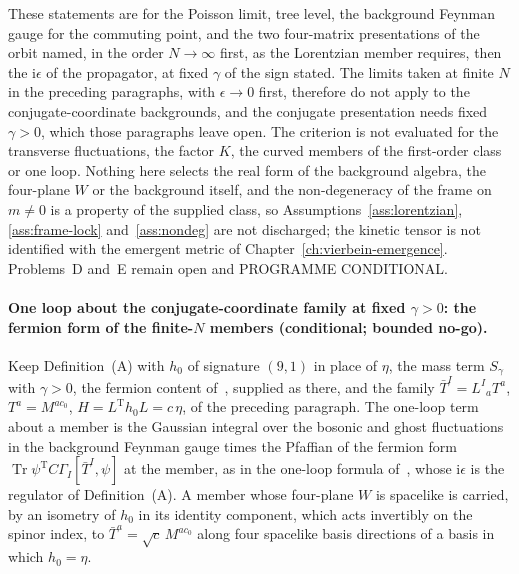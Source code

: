 These statements are for the Poisson limit, tree level, the background Feynman gauge for the commuting point, and the two four-matrix presentations of the orbit named, in the order \(N\to\infty\) first, as the Lorentzian member requires, then the \(\mathrm i\epsilon\) of the propagator, at fixed \(\gamma\) of the sign stated. The limits taken at finite \(N\) in the preceding paragraphs, with \(\epsilon\to0\) first, therefore do not apply to the conjugate-coordinate backgrounds, and the conjugate presentation needs fixed \(\gamma>0\), which those paragraphs leave open. The criterion is not evaluated for the transverse fluctuations, the factor \(K\), the curved members of the first-order class or one loop. Nothing here selects the real form of the background algebra, the four-plane \(W\) or the background itself, and the non-degeneracy of the frame on \(m\neq0\) is a property of the supplied class, so Assumptions~\ref{ass:lorentzian}, \ref{ass:frame-lock} and~\ref{ass:nondeg} are not discharged; the kinetic tensor is not identified with the emergent metric of Chapter~\ref{ch:vierbein-emergence}. Problems~D and~E remain open and PROGRAMME CONDITIONAL.

\paragraph{One loop about the conjugate-coordinate family at fixed \(\gamma>0\): the fermion form of the finite-\(N\) members (conditional; bounded no-go).}
Keep Definition~(A) with \(h_0\) of signature \((9,1)\) in place of \(\eta\), the mass term \(S_\gamma\) with \(\gamma>0\), the fermion content of~\cite{IKKT1997}, supplied as there, and the family \(\bar T^I=L^I{}_aT^a\), \(T^a=M^{ac_0}\), \(H=L^{\mathrm T}h_0L=c\,\eta\), of the preceding paragraph. The one-loop term about a member is the Gaussian integral over the bosonic and ghost fluctuations in the background Feynman gauge times the Pfaffian of the fermion form \(\operatorname{Tr}\psi^{\mathrm T}C\Gamma_I[\bar T^I,\psi]\) at the member, as in the one-loop formula of~\cite{Steinacker2023}, whose \(\mathrm i\epsilon\) is the regulator of Definition~(A). A member whose four-plane \(W\) is spacelike is carried, by an isometry of \(h_0\) in its identity component, which acts invertibly on the spinor index, to \(\bar T^a=\sqrt c\,M^{ac_0}\) along four spacelike basis directions of a basis in which \(h_0=\eta\).


